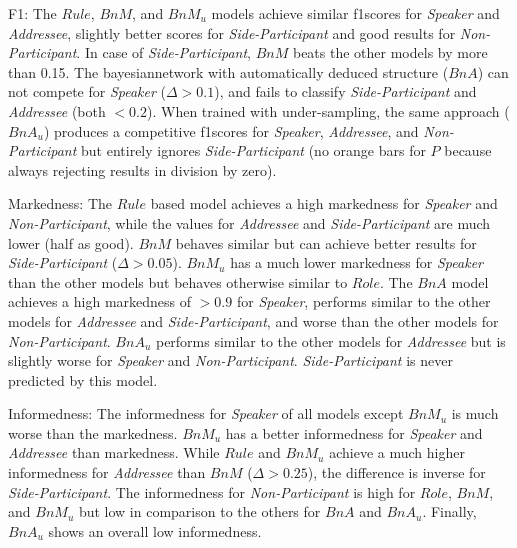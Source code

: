 \begin{description}
    \item{F1:} The \(Rule\), \(BnM\), and \(BnM_u\) models achieve similar \glspl{f1score} for \emph{Speaker} and \emph{Addressee}, slightly better scores for \emph{Side\hyp{}Participant} and good results for \emph{Non\hyp{}Participant}.
    In case of \emph{Side\hyp{}Participant}, \(BnM\) beats the other models by more than 0.15.
    The \gls{bayesiannetwork} with automatically deduced structure (\(BnA\)) can not compete for \emph{Speaker} (\(\Delta > 0.1\)), and fails to classify \emph{Side\hyp{}Participant} and \emph{Addressee} (both \(<0.2\)).
    When trained with under\hyp{}sampling, the same approach (\(BnA_u\)) produces a competitive \glspl{f1score} for \emph{Speaker}, \emph{Addressee}, and \emph{Non\hyp{}Participant} but entirely ignores \emph{Side\hyp{}Participant} (no orange bars for \(P\) because always rejecting results in division by zero).
    \item{Markedness:} The \(Rule\) based model achieves a high \gls{markedness} for \emph{Speaker} and \emph{Non\hyp{}Participant}, while the values for \emph{Addressee} and \emph{Side\hyp{}Participant} are much lower (half as good).
    \(BnM\) behaves similar but can achieve better results for \emph{Side\hyp{}Participant} (\(\Delta > 0.05\)).
    \(BnM_u\) has a much lower \gls{markedness} for \emph{Speaker} than the other models but behaves otherwise similar to \(Role\).
    The \(BnA\) model achieves a high \gls{markedness} of \(>0.9\) for \emph{Speaker}, performs similar to the other models for \emph{Addressee} and \emph{Side-Participant}, and worse than the other models for \emph{Non-Participant}.
    \(BnA_u\) performs similar to the other models for \emph{Addressee} but is slightly worse for \emph{Speaker} and \emph{Non-Participant}.
    \emph{Side-Participant} is never predicted by this model.
    \item{Informedness:} The \gls{informedness} for \emph{Speaker} of all models except \(BnM_u\) is much worse than the \gls{markedness}.
    \(BnM_u\) has a better \gls{informedness} for \emph{Speaker} and \emph{Addressee} than \gls{markedness}.
    While \(Rule\) and \(BnM_u\) achieve a much higher \gls{informedness} for \emph{Addressee} than \(BnM\) (\(\Delta > 0.25\)), the difference is inverse for \emph{Side-Participant}.
    The \gls{informedness} for \emph{Non-Participant} is high for \(Role\), \(BnM\), and \(BnM_u\) but low in comparison to the others for \(BnA\) and \(BnA_u\).
    Finally, \(BnA_u\) shows an overall low \gls{informedness}.
\end{description}

